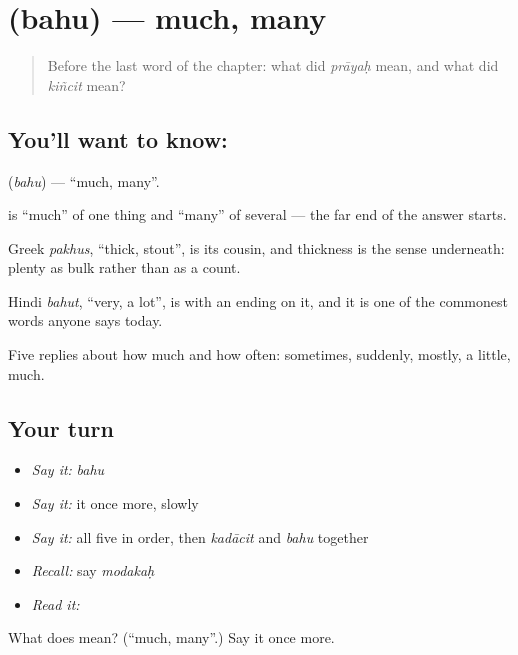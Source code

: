 \section[\texorpdfstring{\sk{बहु} (bahu)}{बहु (bahu)}]{ (bahu) — much, many}

\label{lesson:SA-C42-much}



\begin{quote}
Before the last word of the chapter: what did \emph{prāyaḥ} mean, and what did \emph{kiñcit} mean?
\end{quote}

\subsection*{You'll want to know: }
\textbf{} (\emph{bahu}) — \textquotedblleft{}much, many\textquotedblright{}.

\textbf{} is \textquotedblleft{}much\textquotedblright{} of one thing and \textquotedblleft{}many\textquotedblright{} of several — the far end of the answer \textbf{} starts.

Greek \emph{pakhus}, \textquotedblleft{}thick, stout\textquotedblright{}, is its cousin, and thickness is the sense underneath: plenty as bulk rather than as a count.

Hindi \emph{bahut}, \textquotedblleft{}very, a lot\textquotedblright{}, is \textbf{} with an ending on it, and it is one of the commonest words anyone says today.

\begin{grammarlens}[title={What you've built}]
Five replies about how much and how often: sometimes, suddenly, mostly, a little, much.
\end{grammarlens}

\subsection*{Your turn}
\begin{itemize}
\raggedright
  \item \emph{Say it:} \emph{bahu}
  \item \emph{Say it:} it once more, slowly
  \item \emph{Say it:} all five in order, then \emph{kadācit} and \emph{bahu} together
  \item \emph{Recall:} say \emph{modakaḥ}
  \item \emph{Read it:} \textbf{}
\end{itemize}

\begin{tcolorbox}[breakable,colback=teal!4,colframe=teal!35!black,title={Before you move on}]
What does  mean? (\textquotedblleft{}much, many\textquotedblright{}.) Say it once more.
\end{tcolorbox}
